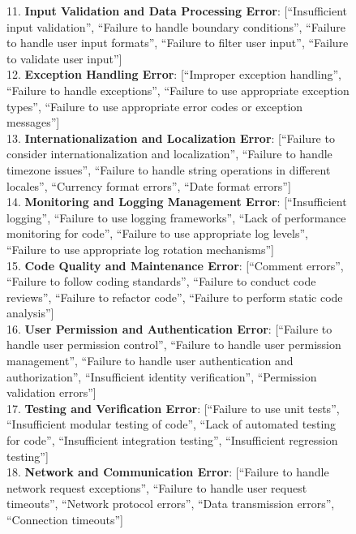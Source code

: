 \documentclass[11pt, a4paper, logo, copyright, nonumbering, amsart]{map}
\begin{document}
\begin{CJK*}{UTF8}{gbsn}
\begin{figure*}[h!]
\begin{center}
\begin{tcolorbox}[width=1\textwidth, colback=lightblue, title={\textbf{Full Error Typelists}}]
    11. \textbf{Input Validation and Data Processing Error}: [``Insufficient input validation'', ``Failure to handle boundary conditions'', ``Failure to handle user input formats'', ``Failure to filter user input'', ``Failure to validate user input''] \\
    
    12. \textbf{Exception Handling Error}: [``Improper exception handling'', ``Failure to handle exceptions'', ``Failure to use appropriate exception types'', ``Failure to use appropriate error codes or exception messages''] \\
    
    13. \textbf{Internationalization and Localization Error}: [``Failure to consider internationalization and localization'', ``Failure to handle timezone issues'', ``Failure to handle string operations in different locales'', ``Currency format errors'', ``Date format errors''] \\
    
    14. \textbf{Monitoring and Logging Management Error}: [``Insufficient logging'', ``Failure to use logging frameworks'', ``Lack of performance monitoring for code'', ``Failure to use appropriate log levels'', ``Failure to use appropriate log rotation mechanisms''] \\
    
    15. \textbf{Code Quality and Maintenance Error}: [``Comment errors'', ``Failure to follow coding standards'', ``Failure to conduct code reviews'', ``Failure to refactor code'', ``Failure to perform static code analysis''] \\
    
    16. \textbf{User Permission and Authentication Error}: [``Failure to handle user permission control'', ``Failure to handle user permission management'', ``Failure to handle user authentication and authorization'', ``Insufficient identity verification'', ``Permission validation errors''] \\
    
    17. \textbf{Testing and Verification Error}: [``Failure to use unit tests'', ``Insufficient modular testing of code'', ``Lack of automated testing for code'', ``Insufficient integration testing'', ``Insufficient regression testing''] \\
    
    18. \textbf{Network and Communication Error}: [``Failure to handle network request exceptions'', ``Failure to handle user request timeouts'', ``Network protocol errors'', ``Data transmission errors'', ``Connection timeouts''] \\
    

\end{tcolorbox}
\end{center}
\end{figure*}
\end{CJK*}
\end{document}
